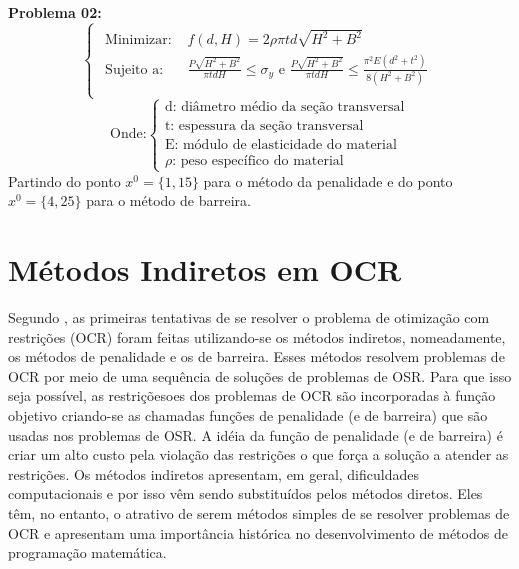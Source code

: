 \documentclass[10pt, a4paper]{article}
\begin{document}
\textbf{Problema 02:}
\[
      \begin{cases}
            \begin{aligned}
            \text{Minimizar:  }     & f(d, H) = 2\rho \pi t d \sqrt{H^2+B^2}\\
            \text{Sujeito a:  }     & \frac{P \sqrt{H^2+B^2}}{\pi t d H} \leq \sigma_y \text{ e } \frac{P \sqrt{H^2+B^2}}{\pi t d H} \leq \frac{\pi^2 E (d^2+t^2)}{8(H^2+B^2)}\\
            \end{aligned}
      \end{cases}
\]
\small
\[
\text{Onde:} \begin{cases}
      \text{d: di\^ametro m\'edio da se\c c\~ao transversal}\\
      \text{t: espessura da se\c c\~ao transversal}\\
      \text{E: m\'odulo de elasticidade do material}\\
      \text{$\rho$: peso espec\'ifico do material}
\end{cases}
\]
\normalsize
Partindo do ponto $x^0=\{1,15\}$ para o m\'etodo da penalidade e do ponto $x^0=\{4,25\}$ para o m\'etodo de barreira.


\section{M\'etodos Indiretos em OCR}

Segundo \cite{apostila}, as primeiras tentativas de se resolver o problema de otimiza\c c\~ao com restri\c c\~oes (OCR) foram feitas utilizando-se os m\'etodos indiretos, nomeadamente, os m\'etodos de penalidade e os de barreira. Esses m\'etodos resolvem problemas de OCR por meio de uma sequ\^encia de solu\c c\~oes de problemas de OSR. Para que isso seja poss\'ivel, as restri\c c\~oesoes dos problemas de OCR s\~ao incorporadas \`a fun\c c\~ao objetivo criando-se as chamadas fun\c c\~oes de penalidade (e de barreira) que s\~ao usadas nos problemas de OSR. A id\'eia da fun\c c\~ao de penalidade (e de barreira) \'e criar um alto custo pela viola\c c\~ao das restri\c c\~oes o que for\c ca a solu\c c\~ao a atender as restri\c c\~oes. Os m\'etodos indiretos apresentam, em geral, dificuldades computacionais e por isso v\^em sendo substitu\'idos pelos m\'etodos diretos. Eles t\^em, no entanto, o atrativo de serem m\'etodos simples de se resolver problemas de OCR e apresentam uma import\^ancia hist\'orica no desenvolvimento de m\'etodos de programa\c c\~ao matem\'atica.
\end{document}
